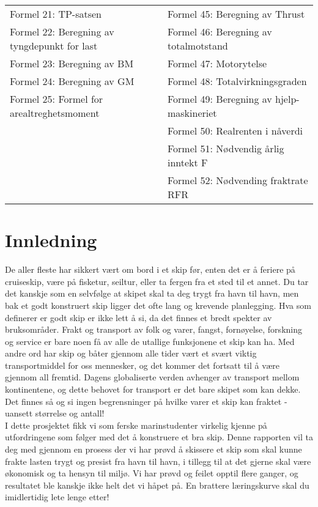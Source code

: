 \documentclass[norsk]{article}
\begin{document}
\begin{table}[htbp]
\begin{tabular}{l|l}
      Formel 21: TP-satsen & Formel 45: Beregning av Thrust\\
      Formel 22: Beregning av tyngdepunkt for last & Formel 46: Beregning av totalmotstand\\
      Formel 23: Beregning av BM & Formel 47: Motorytelse\\
      Formel 24: Beregning av GM & Formel 48: Totalvirkningsgraden\\ 
      Formel 25: Formel for arealtreghetsmoment & Formel 49: Beregning av hjelp-maskineriet\\
      & Formel 50: Realrenten i nåverdi\\ 
      & Formel 51: Nødvendig årlig inntekt F\\
      & Formel 52: Nødvending fraktrate RFR\\       
    \end{tabular}
\end{table}

\newpage

\section{Innledning} 
De aller fleste har sikkert vært om bord i et skip før, enten det er å feriere på cruiseskip, være på fisketur, seiltur, eller ta fergen fra et sted til et annet. Du tar det kanskje som en selvfølge at skipet skal ta deg trygt fra havn til havn, men bak et godt konstruert skip ligger det ofte lang og krevende planlegging. Hva som definerer er godt skip er ikke lett å si, da det finnes et bredt spekter av bruksområder. Frakt og transport av folk og varer, fangst, fornøyelse, forskning og service er bare noen få av alle de utallige funksjonene et skip kan ha. Med andre ord har skip og båter gjennom alle tider vært et svært viktig transportmiddel for oss mennesker, og det kommer det fortsatt til å være gjennom all fremtid. Dagens globaliserte verden avhenger av transport mellom kontinentene, og dette behovet for transport er det bare skipet som kan dekke. Det finnes så og si ingen begrensninger på hvilke varer et skip kan fraktet - uansett størrelse og antall! \\

I dette prosjektet fikk vi som ferske marinstudenter virkelig kjenne på utfordringene som følger med det å konstruere et bra skip. Denne rapporten vil ta deg med gjennom en prosess der vi har prøvd å skissere et skip som skal kunne frakte lasten trygt og presist fra havn til havn, i tillegg til at det gjerne skal være økonomisk og ta hensyn til miljø. Vi har prøvd og feilet opptil flere ganger, og resultatet ble kanskje ikke helt det vi håpet på. En brattere læringskurve skal du imidlertidig lete lenge etter!\\ 
\end{document}
